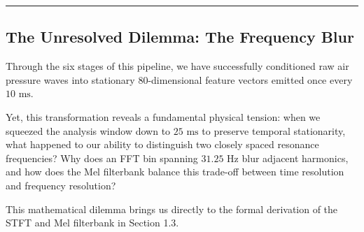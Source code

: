 \documentclass[11pt,a4paper]{article}
\begin{document}
\smallskip
\hrule
\smallskip

\subsection*{The Unresolved Dilemma: The Frequency Blur}

Through the six stages of this pipeline, we have successfully conditioned raw air pressure waves into stationary 80-dimensional feature vectors emitted once every $10\text{ ms}$. 

Yet, this transformation reveals a fundamental physical tension: when we squeezed the analysis window down to $25\text{ ms}$ to preserve temporal stationarity, what happened to our ability to distinguish two closely spaced resonance frequencies? Why does an FFT bin spanning $31.25\text{ Hz}$ blur adjacent harmonics, and how does the Mel filterbank balance this trade-off between time resolution and frequency resolution?

This mathematical dilemma brings us directly to the formal derivation of the STFT and Mel filterbank in Section 1.3.
\end{document}
